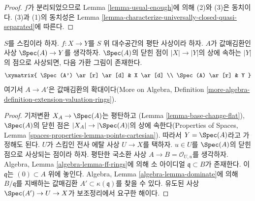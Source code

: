 \begin{proof}
$f$가 분리되었으므로 Lemma \ref{lemma-usual-enough}에 의해
(2)와 (3)은 동치이다. (3)과 (1)의 동치성은 Lemma
\ref{lemma-characterize-universally-closed-quasi-separated}에 따른다.
\end{proof}

\begin{lemma}
\label{lemma-lift-valuation-ring-through-flat-morphism}
$S$를 스킴이라 하자. $f : X \to Y$를 $S$ 위 대수공간의 평탄 사상이라
하자. $A$가 값매김환인 사상 $\Spec(A) \to Y$를 생각하자.
$\Spec(A)$의 닫힌 점이 $|X| \to |Y|$의 상에 속하는 $|Y|$의 점으로
사상되면, 다음 가환 그림이 존재한다.
$$
\xymatrix{
\Spec(A') \ar[r] \ar[d] & X \ar[d] \\
\Spec(A) \ar[r] & Y
}
$$
여기서 $A \to A'$은 값매김환의 확대이다(More on Algebra, Definition
\ref{more-algebra-definition-extension-valuation-rings}).
\end{lemma}

\begin{proof}
기저변환 $X_A \to \Spec(A)$는 평탄하고
(Lemma \ref{lemma-base-change-flat}), $\Spec(A)$의 닫힌 점은
$|X_A| \to |\Spec(A)|$의 상에 속한다(Properties of Spaces, Lemma
\ref{spaces-properties-lemma-points-cartesian}). 따라서 $Y = \Spec(A)$라고
가정해도 된다. $U$가 스킴인 전사 에탈 사상 $U \to X$를 택하자.
$u \in U$를 $\Spec(A)$의 닫힌 점으로 사상되는 점이라 하자. 평탄한
국소환 사상 $A \to B = \mathcal{O}_{U, u}$를 생각하자. Algebra, Lemma
\ref{algebra-lemma-ff-rings}에 의해 소 아이디얼
$\mathfrak q \subset B$가 존재한다. 이 $\mathfrak q$는
$(0) \subset A$ 위에 놓인다. Algebra, Lemma
\ref{algebra-lemma-dominate}에 의해 $B/\mathfrak q$를 지배하는 값매김환
$A' \subset \kappa(\mathfrak q)$를 찾을 수 있다. 유도된 사상
$\Spec(A') \to U \to X$가 보조정리에서 요구한 해이다.
\end{proof}


